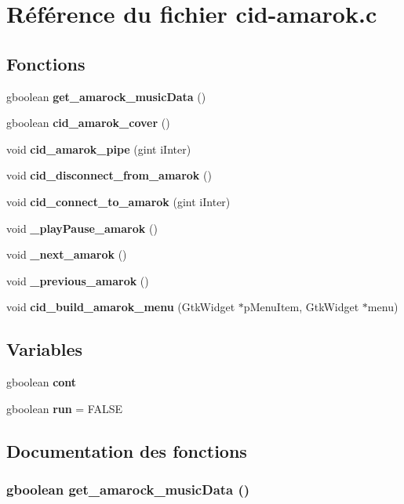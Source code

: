 \section{Référence du fichier cid-amarok.c}
\label{cid-amarok_8c}
\subsection*{Fonctions}
\begin{CompactItemize}
\item 
gboolean {\bf get\_\-amarock\_\-musicData} ()
\item 
gboolean {\bf cid\_\-amarok\_\-cover} ()
\item 
void {\bf cid\_\-amarok\_\-pipe} (gint iInter)
\item 
void {\bf cid\_\-disconnect\_\-from\_\-amarok} ()
\item 
void {\bf cid\_\-connect\_\-to\_\-amarok} (gint iInter)
\item 
void {\bf \_\-playPause\_\-amarok} ()
\item 
void {\bf \_\-next\_\-amarok} ()
\item 
void {\bf \_\-previous\_\-amarok} ()
\item 
void {\bf cid\_\-build\_\-amarok\_\-menu} (GtkWidget $\ast$pMenuItem, GtkWidget $\ast$menu)
\end{CompactItemize}
\subsection*{Variables}
\begin{CompactItemize}
\item 
gboolean {\bf cont}
\item 
gboolean {\bf run} = FALSE
\end{CompactItemize}


\subsection{Documentation des fonctions}
\subsubsection{\setlength{\rightskip}{0pt plus 5cm}gboolean get\_\-amarock\_\-musicData ()}\label{cid-amarok_8c_ccd350392dc5e106f78289692cc8a751}




